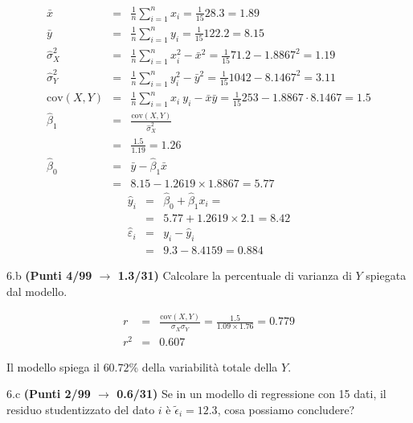 \documentclass[
  11pt,
]{book}
\theoremstyle{mytheoremstyle}
\theoremstyle{mydefstyle}
\newenvironment{sol}
  {
  \begin{tcolorbox}[enhanced,breakable,arc=0.1mm,boxrule=1pt,colback=white,colframe=iblue,
  title=\bf \fontfamily{lmss}\selectfont \hspace{.5 cm} Soluzione,drop fuzzy shadow]

}{
\end{tcolorbox}
  }
\begin{document}
\begin{sol}
\begin{eqnarray*}
           \bar x &=&\frac 1 n\sum_{i=1}^n x_i = \frac {1}{ 15 }  28.3 =  1.89 \\
           \bar y &=&\frac 1 n\sum_{i=1}^n y_i = \frac {1}{ 15 }  122.2 =  8.15 \\
           \hat\sigma_X^2&=&\frac 1 n\sum_{i=1}^n x_i^2-\bar x^2=\frac {1}{ 15 }  71.2  - 1.8867 ^2= 1.19 \\
           \hat\sigma_Y^2&=&\frac 1 n\sum_{i=1}^n y_i^2-\bar y^2=\frac {1}{ 15 }  1042  - 8.1467 ^2= 3.11 \\
           \text{cov}(X,Y)&=&\frac 1 n\sum_{i=1}^n x_i~y_i-\bar x\bar y=\frac {1}{ 15 }  253 - 1.8867 \cdot 8.1467 = 1.5 \\
           \hat\beta_1 &=& \frac{\text{cov}(X,Y)}{\hat\sigma_X^2} \\
                    &=& \frac{ 1.5 }{ 1.19 }  =  1.26 \\
           \hat\beta_0 &=& \bar y - \hat\beta_1 \bar x\\
                    &=&  8.15 - 1.2619 \times  1.8867 = 5.77 
         \end{eqnarray*}\begin{eqnarray*}
\hat y_i &=&\hat\beta_0+\hat\beta_1 x_i=\\ 
&=& 5.77 + 1.2619 \times 2.1 = 8.42 \\ 
\hat \varepsilon_i &=& y_i-\hat y_i\\ 
&=& 9.3 - 8.4159 = 0.884  
\end{eqnarray*}

\end{sol}

6.b \textbf{(Punti 4/99 \(\rightarrow\) 1.3/31)} Calcolare la percentuale di varianza di \(Y\) spiegata dal modello.

\begin{sol}
\begin{eqnarray*}
r&=&\frac{\text{cov}(X,Y)}{\sigma_X\sigma_Y}=\frac{ 1.5 }{ 1.09 \times 1.76 }= 0.779 \\ 
r^2&=& 0.607\end{eqnarray*}

Il modello spiega il \(60.72\%\) della variabilità totale della \(Y\).

\end{sol}

6.c \textbf{(Punti 2/99 \(\rightarrow\) 0.6/31)} Se in un modello di regressione con 15 dati,
il residuo studentizzato del dato \(i\) è \(\tilde \epsilon_i=12.3\), cosa possiamo concludere?
\end{document}
